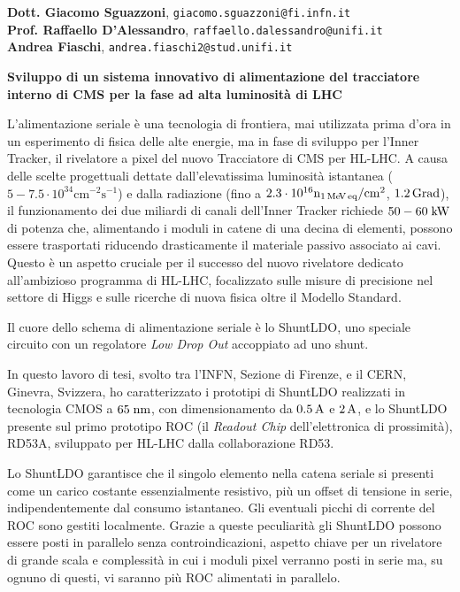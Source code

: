 \documentclass[a4paper,12pt,italian]{article}
\begin{document}

\pagestyle{plain}
\noindent

 {\bf Dott. Giacomo Sguazzoni}, {\tt giacomo.sguazzoni@fi.infn.it}\\
 {\bf Prof. Raffaello D'Alessandro}, {\tt raffaello.dalessandro@unifi.it}\\
 {\bf Andrea Fiaschi}, {\tt andrea.fiaschi2@stud.unifi.it}

\vskip 0.5cm

\noindent \textbf{Sviluppo di un sistema innovativo di alimentazione del tracciatore interno di CMS per la fase ad alta luminosità di LHC}

\vskip 0.5cm

 L'alimentazione seriale \`e una tecnologia di frontiera, mai utilizzata prima d'ora in un esperimento di fisica delle alte energie, ma in fase di sviluppo per l'Inner Tracker, il rivelatore a pixel del nuovo Tracciatore di CMS per HL-LHC. A causa delle scelte progettuali dettate dall'elevatissima luminosit\`a istantanea ($\mathrm{5-7.5\cdot 10^{34}cm^{-2}s^{-1}}$) e dalla radiazione (fino a $\mathrm{2.3\cdot10^{16} n_{1{\rm \, Me\kern-0.125em V}\, eq}/cm^2}$, $1.2{\rm \, Grad}$), il funzionamento dei due miliardi di canali dell'Inner Tracker richiede $50-60\rm \; kW$ di potenza che, alimentando i moduli in catene di una decina di elementi, possono essere trasportati riducendo drasticamente il materiale passivo associato ai cavi. Questo \`e un aspetto cruciale per il successo del nuovo rivelatore dedicato all'ambizioso programma di HL-LHC, focalizzato sulle misure di precisione nel settore di Higgs e sulle ricerche di nuova fisica oltre il Modello Standard.

Il cuore dello schema di alimentazione seriale \`e lo ShuntLDO, uno speciale circuito con un regolatore \textit{Low Drop Out} accoppiato ad uno shunt. 

In questo lavoro di tesi, svolto tra l'INFN, Sezione di Firenze, e il CERN, Ginevra, Svizzera, ho caratterizzato i prototipi di ShuntLDO realizzati in tecnologia CMOS a $65\rm \; nm$, con dimensionamento da $0.5\rm \, A$ e $2\rm \, A$, e lo ShuntLDO presente sul primo prototipo ROC (il \textit{Readout Chip} dell'elettronica di prossimit\`a), RD53A, sviluppato per HL-LHC dalla collaborazione RD53. 

Lo ShuntLDO garantisce che il singolo elemento nella catena seriale si presenti come un carico costante essenzialmente resistivo, pi\`u un offset di tensione in serie, indipendentemente dal consumo istantaneo. Gli eventuali picchi di corrente del ROC sono gestiti localmente.
Grazie a queste peculiarit\`a gli ShuntLDO possono essere posti in parallelo senza controindicazioni, aspetto chiave per un rivelatore di grande scala e complessit\`a in cui i moduli pixel verranno posti in serie ma, su ognuno di questi, vi saranno più ROC alimentati in parallelo.
 
\end{document}
